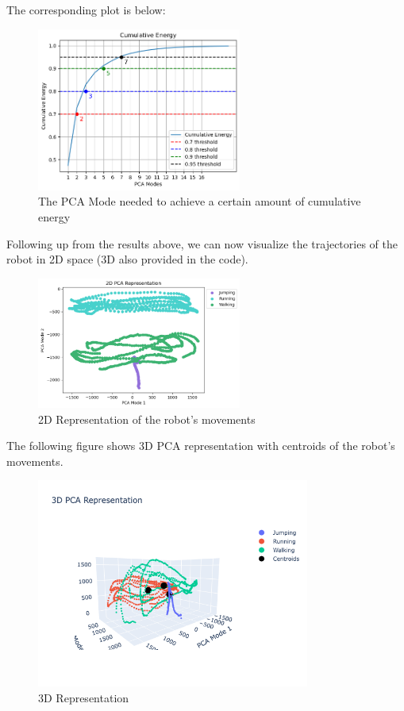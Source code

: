 \documentclass[11pt]{amsart}
\begin{document}
The corresponding plot is below:

\begin{figure}[H]
    \centering
    \includegraphics[width=0.6\textwidth]{PCA_mode_energy.png}
    \caption{The PCA Mode needed to achieve a certain amount of cumulative energy}
\end{figure}


Following up from the results above, we can now visualize the trajectories of the robot in 2D space (3D also provided in the code).

\begin{figure}[H]
    \centering
    \includegraphics[width=0.6\textwidth]{quick.png}
    \caption{2D Representation of the robot's movements}
\end{figure}

The following figure shows 3D PCA representation with centroids of the robot's movements.


\begin{figure}[H]
    \centering
    \includegraphics[width=0.8\textwidth]{3D PCA Centroid.png}
    \caption{3D Representation}
\end{figure}
\end{document}
